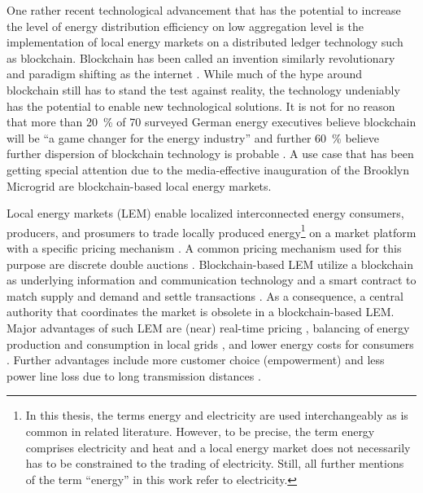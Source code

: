 One rather recent technological advancement that has the potential to increase the level of energy distribution efficiency on low aggregation level is the implementation of local energy markets on a distributed ledger technology such as blockchain. Blockchain has been called an invention similarly revolutionary and paradigm shifting as the internet \citep{Swan:2015}. While much of the hype around blockchain still has to stand the test against reality, the technology undeniably has the potential to enable new technological solutions. It is not for no reason that more than 20~\% of 70 surveyed German energy executives believe blockchain will be “a game changer for the energy industry” and further 60~\% believe further dispersion of blockchain technology is probable \citep{Burger:2016}. A use case that has been getting special attention due to the media-effective inauguration of the Brooklyn Microgrid \citep{newscientist:2016} are blockchain-based local energy markets.

Local energy markets (LEM) enable localized interconnected energy consumers, producers, and prosumers to trade locally produced energy\footnote{In this thesis, the terms energy and electricity are used interchangeably as is common in related literature. However, to be precise, the term energy comprises electricity and heat and a local energy market does not necessarily has to be constrained to the trading of electricity. Still, all further mentions of the term ``energy'' in this work refer to electricity.} on a market platform with a specific pricing mechanism \citep{Mengelkamp:2018a}. A common pricing mechanism used for this purpose are discrete double auctions \citep{Lamparter:2010, Buchmann:2013, Block:2008}.  Blockchain-based LEM utilize a blockchain as underlying information and communication technology and a smart contract to match supply and demand and settle transactions \citep{Mengelkamp:2018b}. As a consequence, a central authority that coordinates the market is obsolete in a blockchain-based LEM. Major advantages of such LEM are (near) real-time pricing \citep{Mihaylov:2014}, balancing of energy production and consumption in local grids \citep{Stadler:2016}, and lower energy costs for consumers \citep{Mengelkamp:2018agentstrategies}. Further advantages include more customer choice (empowerment) \citep{Koirala:2016} and less power line loss due to long transmission distances \citep{Hvelplund:2006}.

